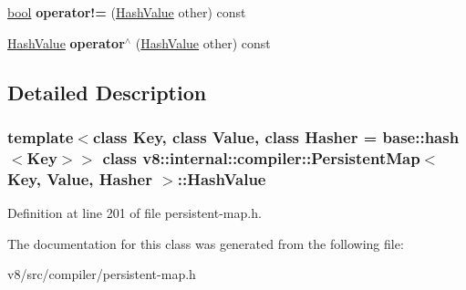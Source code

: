 \begin{DoxyCompactItemize}
\mbox{\hyperlink{classbool}{bool}} {\bfseries operator!=} (\mbox{\hyperlink{classv8_1_1internal_1_1compiler_1_1PersistentMap_1_1HashValue}{Hash\+Value}} other) const
\item 
\mbox{\label{classv8_1_1internal_1_1compiler_1_1PersistentMap_1_1HashValue_a3e079a326b0e5c36e4df7bf08bf377e7}} 
\mbox{\hyperlink{classv8_1_1internal_1_1compiler_1_1PersistentMap_1_1HashValue}{Hash\+Value}} {\bfseries operator$^\wedge$} (\mbox{\hyperlink{classv8_1_1internal_1_1compiler_1_1PersistentMap_1_1HashValue}{Hash\+Value}} other) const
\end{DoxyCompactItemize}


\subsection{Detailed Description}
\subsubsection*{template$<$class Key, class Value, class Hasher = base\+::hash$<$\+Key$>$$>$\newline
class v8\+::internal\+::compiler\+::\+Persistent\+Map$<$ Key, Value, Hasher $>$\+::\+Hash\+Value}



Definition at line 201 of file persistent-\/map.\+h.



The documentation for this class was generated from the following file\+:\begin{DoxyCompactItemize}
\item 
v8/src/compiler/persistent-\/map.\+h\end{DoxyCompactItemize}
